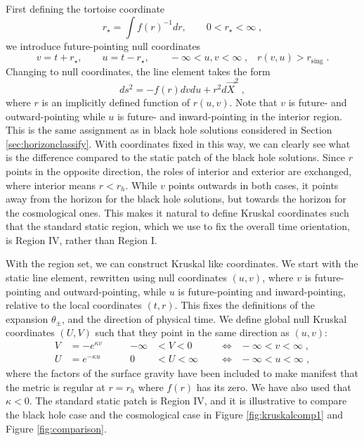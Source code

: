First defining the tortoise coordinate
\begin{equation*}
  r_\star = \int f(r)^{-1} dr, \qquad 0 < r_\star < \infty \;,
\end{equation*}
we introduce future-pointing null coordinates
\begin{equation*}
    v = t + r_\star, \qquad u = t - r_\star, \qquad -\infty < u, v < \infty \;,\;\;\;
    r(v,u) > r_{\mathrm{sing}} \;.
\end{equation*}
Changing to null coordinates, the line element takes the form
\begin{equation*}
  ds^2 = - f(r) dv du + r^2 d\vec{X}^2\;,
\end{equation*}
where $r$ is an implicitly defined function of $r(u, v)$. Note that $v$ is future- and outward-pointing while $u$ is future- and inward-pointing in the interior region. This is the same assignment as in black hole solutions considered in Section \ref{sec:horizonclassify}. With coordinates fixed in this way, we can clearly see what is the difference compared to the static patch of the black hole solutions. Since $r$ points in the opposite direction, the roles of interior and exterior are exchanged, where interior means $r  <r_h$. While $v$ points outwards in both cases, it points away from the horizon for the black hole solutions, but towards the horizon for the cosmological ones. This makes it natural to define Kruskal coordinates such that the standard static region, which we use to fix the overall time orientation, is Region IV, rather than Region I. 

With the region set, we can construct Kruskal like coordinates. We start with the static line element, rewritten using null coordinates $(u, v)$, where $v$ is future-pointing and outward-pointing, while $u$ is future-pointing and inward-pointing, relative to the local coordinates $(t, r)$. This fixes the definitions of the expansion $\theta_\pm$, and the direction of physical time. We define global null Kruskal coordinates $(U, V)$ such that they point in the same direction as $(u, v)$:
\begin{equation*}
\begin{aligned}
    V &= - e^{\kappa v} \qquad & - \infty &< V < 0 \; \;&&\Leftrightarrow \; \; -\infty < v < \infty  \;,\\
    U &= e^{- \kappa u} \qquad & 0 &< U < \infty \; \;&&\Leftrightarrow \; \; -\infty < u < \infty  \;,
\end{aligned}
\end{equation*}
where the factors of the surface gravity have been included to make manifest that the metric is regular at $r=r_h$ where $f(r)$ has its zero. We have also used that $\kappa < 0$. The standard static patch is Region IV, and it is illustrative to compare the black hole case and the cosmological case in Figure \ref{fig:kruskalcomp1} and Figure \ref{fig:comparison}.


